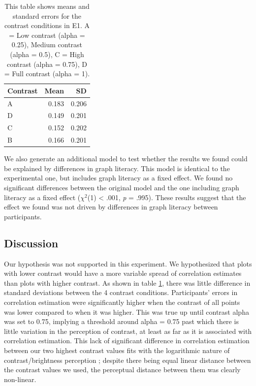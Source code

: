 \documentclass[preprint, 3p,
authoryear]{elsarticle} %
\begin{document}
\begin{table}

\caption{\label{tab:sum-stats-e1}\label{sum-stats-e1}This table shows means and standard errors for the contrast conditions in E1. A = Low contrast (alpha = 0.25), Medium contrast (alpha = 0.5), C = High contrast (alpha = 0.75), D = Full contrast (alpha = 1).}
\centering
\begin{tabular}[t]{lrr}
\toprule
Contrast & Mean & SD\\
\midrule
A & 0.183 & 0.206\\
D & 0.149 & 0.201\\
C & 0.152 & 0.202\\
B & 0.166 & 0.201\\
\bottomrule
\end{tabular}
\end{table}

We also generate an additional model to test whether the results we
found could be explained by differences in graph literacy. This model is
identical to the experimental one, but includes graph literacy as a
fixed effect. We found no significant differences between the original
model and the one including graph literacy as a fixed effect
(\(\chi^2\)(1) \textless{} .001, \emph{p} = .995). These results suggest
that the effect we found was not driven by differences in graph literacy
between participants.

\hypertarget{discussion}{%
\subsection{Discussion}\label{discussion}}

Our hypothesis was not supported in this experiment. We hypothesized
that plots with lower contrast would have a more variable spread of
correlation estimates than plots with higher contrast. As shown in table
\ref{sum-stats-e1}, there was little difference in standard deviations
between the 4 contrast conditions. Participants' errors in correlation
estimation were significantly higher when the contrast of all points was
lower compared to when it was higher. This was true up until contrast
alpha was set to 0.75, implying a threshold around alpha = 0.75 past
which there is little variation in the perception of contrast, at least
as far as it is associated with correlation estimation. This lack of
significant difference in correlation estimation between our two highest
contrast values fits with the logarithmic nature of contrast/brightness
perception \citep{varshney_2013, fechner_1948}; despite there being
equal linear distance between the contrast values we used, the
perceptual distance between them was clearly non-linear.
\end{document}
